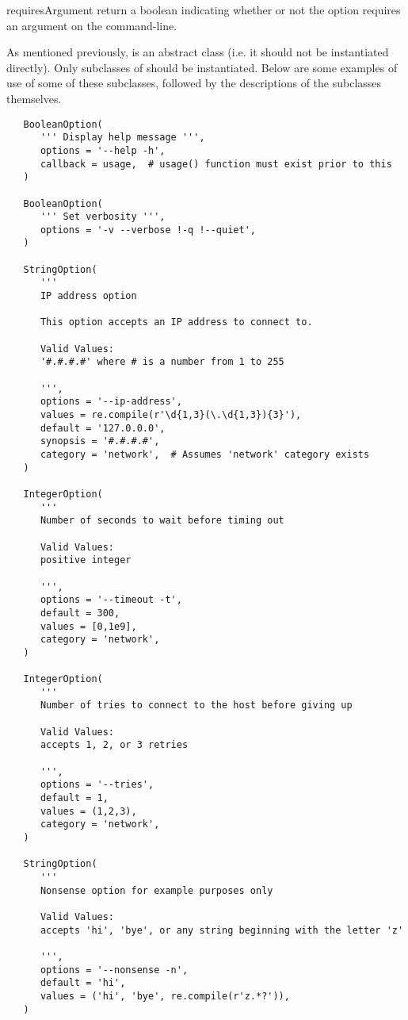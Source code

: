 \begin{methoddesc}[GenericOption]{requiresArgument}{}
return a boolean indicating whether or not the option requires an argument
on the command-line.
\end{methoddesc}

As mentioned previously,  is an abstract class 
(i.e. it should not be instantiated directly).  Only subclasses of 
 should be instantiated.  Below are some examples
of use of some of these subclasses, followed by the descriptions
of the subclasses themselves.

\begin{verbatim}
   BooleanOption(
      ''' Display help message ''',
      options = '--help -h',
      callback = usage,  # usage() function must exist prior to this
   )

   BooleanOption(
      ''' Set verbosity ''',
      options = '-v --verbose !-q !--quiet',
   )

   StringOption(
      '''
      IP address option

      This option accepts an IP address to connect to.

      Valid Values:
      '#.#.#.#' where # is a number from 1 to 255

      ''',
      options = '--ip-address',
      values = re.compile(r'\d{1,3}(\.\d{1,3}){3}'),
      default = '127.0.0.0',
      synopsis = '#.#.#.#',
      category = 'network',  # Assumes 'network' category exists
   )

   IntegerOption(
      '''
      Number of seconds to wait before timing out

      Valid Values:
      positive integer

      ''',
      options = '--timeout -t',
      default = 300,
      values = [0,1e9],
      category = 'network',
   )

   IntegerOption(
      '''
      Number of tries to connect to the host before giving up

      Valid Values:
      accepts 1, 2, or 3 retries

      ''',
      options = '--tries',
      default = 1,
      values = (1,2,3),
      category = 'network',
   )

   StringOption(
      '''
      Nonsense option for example purposes only

      Valid Values:
      accepts 'hi', 'bye', or any string beginning with the letter 'z'

      ''',
      options = '--nonsense -n',
      default = 'hi',
      values = ('hi', 'bye', re.compile(r'z.*?')),
   )
\end{verbatim}

